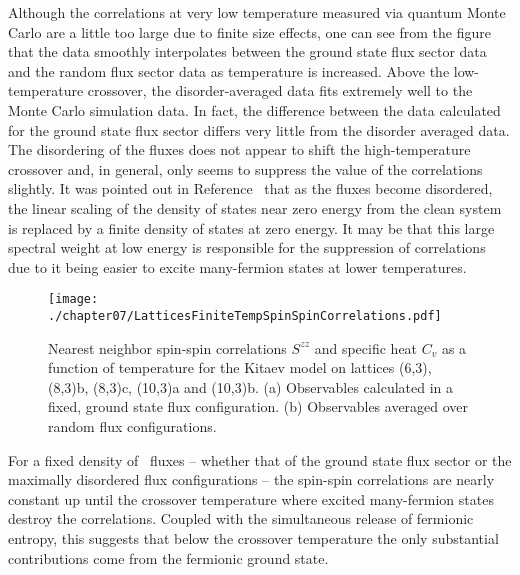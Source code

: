 Although the correlations at very low temperature measured via quantum Monte Carlo are a little too large due to finite size effects, one can see from the figure that the data smoothly interpolates between the ground state flux sector data and the random flux sector data as temperature is increased.
Above the low-temperature crossover, the disorder-averaged data fits extremely well to the Monte Carlo simulation data.
In fact, the difference between the data calculated for the ground state flux sector differs very little from the disorder averaged data.
The disordering of the fluxes does not appear to shift the high-temperature crossover and, in general, only seems to suppress the value of the correlations slightly.
It was pointed out in Reference~\cite{NasuPRB2015} that as the fluxes become disordered, the linear scaling of the density of states near zero energy from the clean system is replaced by a finite density of states at zero energy. 
It may be that this large spectral weight at low energy is responsible for the suppression of correlations due to it being easier to excite many-fermion states at lower temperatures.
%
\begin{figure}[tb]
	\centering
	\texttt{[image: ./chapter07/LatticesFiniteTempSpinSpinCorrelations.pdf]}
	\caption{
		Nearest neighbor spin-spin correlations $S^{zz}$ and specific heat $C_v$ as a function of temperature for the Kitaev model on lattices (6,3), (8,3)b, (8,3)c, (10,3)a and (10,3)b.
		(a) Observables calculated in a fixed, ground state flux configuration.
		(b) Observables averaged over random flux configurations.
	}
	\label{fig:chapter07_LatticesSpinSpinCorrelations}
\end{figure}
%

For a fixed density of \ZZ~fluxes -- whether that of the ground state flux sector or the maximally disordered flux configurations -- the spin-spin correlations are nearly constant up until the crossover temperature where excited many-fermion states destroy the correlations.
Coupled with the simultaneous release of fermionic entropy, this suggests that below the crossover temperature the only substantial contributions come from the fermionic ground state.

